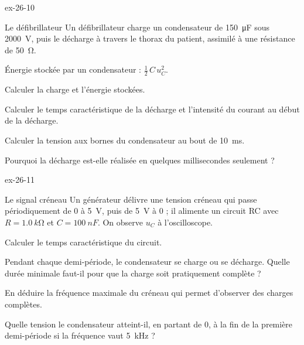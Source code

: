 \begin{blocLivre}{ex-26-10}
\begin{exercice}[2]{Le défibrillateur}
Un défibrillateur charge un condensateur de \qty{150}{\micro F} sous \qty{2000}{V}, puis le décharge à travers le thorax du patient,
assimilé à une résistance de \qty{50}{\ohm}.
\begin{donnees}
Énergie stockée par un condensateur : $\frac12\,C\,u_C^2$.
\end{donnees}
\begin{questions}
\item Calculer la charge et l'énergie stockées.
\item Calculer le temps caractéristique de la décharge et l'intensité du courant au début de la décharge.
\item Calculer la tension aux bornes du condensateur au bout de \qty{10}{ms}.
\item Pourquoi la décharge est-elle réalisée en quelques millisecondes seulement ?
\end{questions}
\end{exercice}
\end{blocLivre}
\begin{blocLivre}{ex-26-11}
\begin{exercice}[2]{Le signal créneau}
Un générateur délivre une tension créneau qui passe périodiquement de 0 à \qty{5}{V}, puis de \qty{5}{V} à 0 ; il alimente un
circuit RC avec $R=\qty{1,0}{k\ohm}$ et $C=\qty{100}{nF}$. On observe $u_C$ à l'oscilloscope.
\begin{questions}
\item Calculer le temps caractéristique du circuit.
\item Pendant chaque demi-période, le condensateur se charge ou se décharge. Quelle durée minimale faut-il pour que la
charge soit pratiquement complète ?
\item En déduire la fréquence maximale du créneau qui permet d'observer des charges complètes.
\item Quelle tension le condensateur atteint-il, en partant de 0, à la fin de la première demi-période si la fréquence vaut
\qty{5}{kHz} ?
\end{questions}
\end{exercice}
\end{blocLivre}
